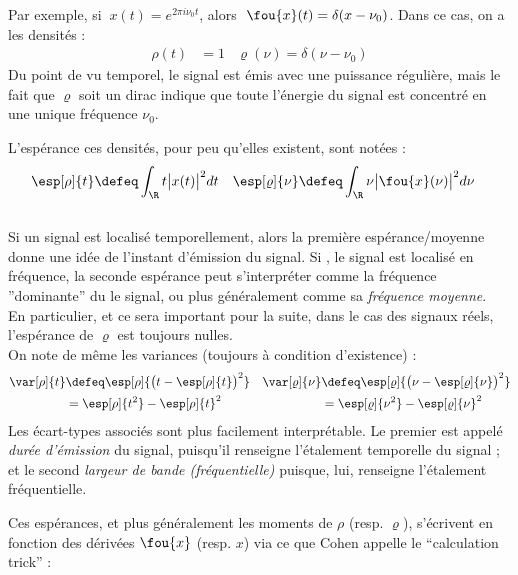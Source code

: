Par exemple, si $\ x(t)=e^{2\pi i\nu_0 t}$, alors $\ \fou{x}(t) = \delta(x-\nu_0)$. Dans ce cas, on a les densités :
\begin{align*}
	\rho(t) &= 1  &  \varrho(\nu) = \delta(\nu-\nu_0)
\end{align*}
Du point de vu temporel, le signal est émis avec une puissance régulière, mais le fait que $\varrho$ soit un dirac indique que toute l'énergie du signal est concentré en une unique fréquence $\nu_0$.


\begin{definition}\label{def:band-width}
	L'espérance ces densités, pour peu qu'elles existent, sont notées :
	\begin{align*}
		\esp[\rho]{t} &\defeq \int_\R t \big|x(t)\big|^2 dt   &  \esp[\varrho]{\nu} &\defeq \int_\R \nu \big|\fou{x}(\nu)\big|^2 d\nu
	\end{align*}
	\\
	Si un signal est localisé temporellement, alors la première espérance/moyenne donne une idée de l'instant d'émission du signal. Si \acontrario, le signal est localisé en fréquence, la seconde espérance peut s'interpréter comme la fréquence ''dominante'' du le signal, ou plus généralement comme sa \emph{fréquence moyenne}. \\
	En particulier, et ce sera important pour la suite, dans le cas des signaux réels, l'espérance de $\varrho$ est toujours nulles.
	\\
	On note de même les variances (toujours à condition d'existence) :
	\begin{align*}
		\var[\rho]{t} &\defeq \esp[\rho]{\big(t-\esp[\rho]{t}\big)^2}  &  \var[\varrho]{\nu} &\defeq \esp[\varrho]{\big(\nu - \esp[\varrho]{\nu}\big)^2}\\
		& = \esp[\rho]{t^2} - \esp[\rho]{t}^2  &  &= \esp[\varrho]{\nu^2} - \esp[\varrho]{\nu}^2
	\end{align*}
	Les écart-types associés sont plus facilement interprétable. Le premier est appelé \emph{durée d'émission} du signal, puisqu'il renseigne l'étalement temporelle du signal ; et le second \emph{largeur de bande (fréquentielle)} puisque, lui, renseigne l'étalement fréquentielle. 
\end{definition}

Ces espérances, et plus généralement les moments de $\rho$ (resp. $\varrho$), s'écrivent en fonction des dérivées $\fou{x}$ (resp. $x$) via ce que Cohen appelle le ``calculation trick'' \cite{cohen_time_1995} :


